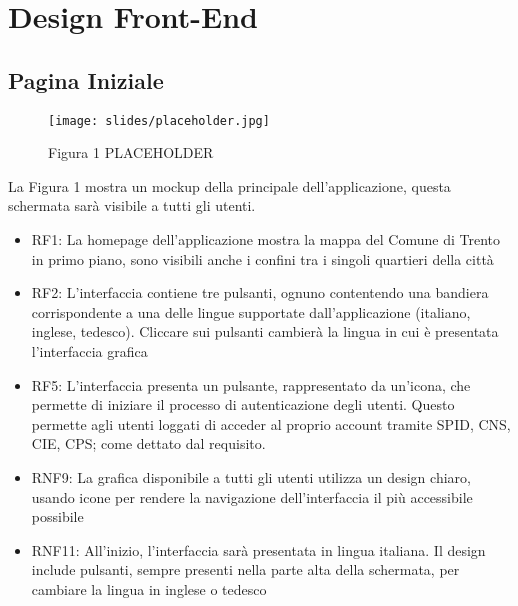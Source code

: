 \chapter{Design Front-End}
\thispagestyle{stdPage}


\section{Pagina Iniziale}

    \begin{figure}
        \texttt{[image: slides/placeholder.jpg]} %
        \caption{Figura 1 PLACEHOLDER}
    \end{figure}

    La Figura 1 mostra un mockup della principale dell'applicazione, questa schermata sarà visibile a tutti gli utenti.

    \begin{itemize} %
        \item RF1: La homepage dell'applicazione mostra la mappa del Comune di Trento in primo piano, sono visibili anche i confini tra i singoli quartieri della città
        \item RF2: L'interfaccia contiene tre pulsanti, ognuno contentendo una bandiera corrispondente a una delle lingue supportate dall'applicazione (italiano, inglese, tedesco). Cliccare sui pulsanti cambierà la lingua in cui è presentata l'interfaccia grafica 
        \item RF5: L'interfaccia presenta un pulsante, rappresentato da un'icona, che permette di iniziare il processo di autenticazione degli utenti. Questo permette agli utenti loggati di acceder al proprio account tramite SPID, CNS, CIE, CPS; come dettato dal requisito.
        \item RNF9: La grafica disponibile a tutti gli utenti utilizza un design chiaro, usando icone per rendere la navigazione dell'interfaccia il più accessibile possibile
        \item RNF11: All'inizio, l'interfaccia sarà presentata in lingua italiana. Il design include pulsanti, sempre presenti nella parte alta della schermata, per cambiare la lingua in inglese o tedesco
    \end{itemize}



